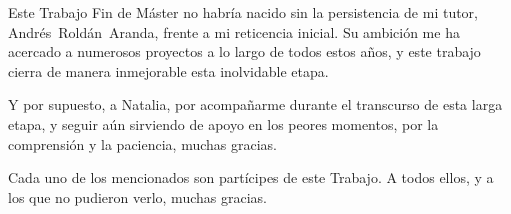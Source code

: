 Este Trabajo Fin de Máster no habría nacido sin la persistencia de mi tutor, Andrés~Roldán~Aranda, frente a mi reticencia inicial. Su ambición me ha acercado a numerosos proyectos a lo largo de todos estos años, y este trabajo cierra de manera inmejorable esta inolvidable etapa.

Y por supuesto, a Natalia, por acompañarme durante el transcurso de esta larga etapa, y seguir aún sirviendo de apoyo en los peores momentos, por la comprensión y la paciencia, muchas gracias.


Cada uno de los mencionados son partícipes de este Trabajo. A todos ellos, y a los que no pudieron verlo, muchas gracias.

\afterpage{\blankpage}
